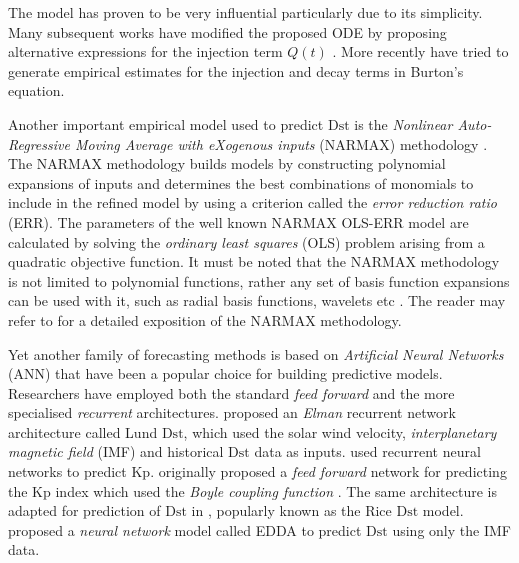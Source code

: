 The \citet{JGR:JGR10260} model has proven to be very influential particularly due to its 
simplicity. Many subsequent works have modified the proposed ODE by proposing alternative 
expressions for the injection term $Q(t)$ \citep{Wang:Dst,JGRA:JGRA14856}. More recently 
\citet{Ballatore2014} have tried to generate empirical estimates for the injection and decay terms 
in Burton's equation.

Another important empirical model used to predict $\mathrm{Dst}$ is the 
\emph{Nonlinear Auto-Regressive Moving Average with eXogenous inputs} (NARMAX) methodology 
\citep{doi:10.1080/00207178908559767,GRL:GRL13494,GRL:GRL20944,JGRA:JGRA18657,balikhin:narmax,JGRA:JGRA20661,JGRA:JGRA50192}. The NARMAX methodology builds models by constructing polynomial expansions of 
inputs and determines the best combinations of monomials to include in the refined model by using a 
criterion called the \emph{error reduction ratio} (ERR). The parameters of the well known NARMAX 
OLS-ERR model are calculated by solving the \emph{ordinary least squares} (OLS) problem arising 
from a quadratic objective function. It must be noted that the NARMAX methodology is not limited to 
polynomial functions, rather any set of basis function expansions can be used with it, such as 
radial basis functions, wavelets etc \citep{doi:10.1080/00207720600903011,JGRA:JGRA17327}. The 
reader may refer to \citet{billings2013nonlinear} for a detailed exposition of the NARMAX 
methodology.

Yet another family of forecasting methods is based on \emph{Artificial Neural Networks} (ANN) that 
have been a popular choice for building predictive models. Researchers have employed both the 
standard \emph{feed forward} and the more specialised \emph{recurrent} architectures. \citet{Lund} 
proposed an \emph{Elman} recurrent network architecture called Lund $\mathrm{Dst}$, which used the 
solar wind velocity, \emph{interplanetary magnetic field} (IMF) and historical $\mathrm{Dst}$ data 
as inputs. \citet{JGRA:JGRA17461} used recurrent neural networks to predict $\mathrm{Kp}$. 
\citet{SWE:SWE286} originally proposed a \emph{feed forward} network for predicting the 
$\mathrm{Kp}$ index which used the \emph{Boyle coupling function} \citet{boyle1997empirical}. The 
same architecture is adapted for prediction of $\mathrm{Dst}$ in \citet{SWE:SWE286}, popularly 
known as the Rice $\mathrm{Dst}$ model. \citet{pallocchia:hal-00318011} proposed a 
\emph{neural network} model called EDDA to predict $\mathrm{Dst}$ using only the IMF data.

